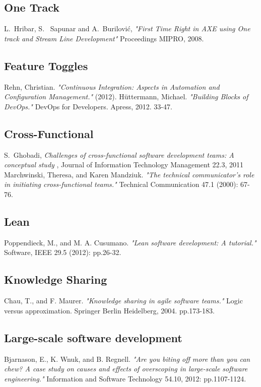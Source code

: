 \documentclass[ProjectPlan_innit.tex]{subfiles}
\begin{document}
\begin{thebibliography}{1}
\subsection{One Track}
\bibitem{} 
L.~Hribar, S. ~Sapunar and A.~Burilović, \emph{"First Time Right in AXE using One track and Stream Line Development"} Proceedings MIPRO, 2008.

\subsection{Feature Toggles}
\bibitem{} 
Rehn, Christian. \emph{"Continuous Integration: Aspects in Automation and Configuration Management."} (2012).
\bibitem{}
Hüttermann, Michael. \emph{"Building Blocks of DevOps."} DevOps for Developers. Apress, 2012. 33-47.


\subsection{Cross-Functional}
\bibitem{} 
S.~Ghobadi, \emph{Challenges of cross-functional software development teams: A conceptual study }, Journal of Information Technology Management 22.3, 2011
\bibitem{} 
Marchwinski, Theresa, and Karen Mandziuk. \emph{"The technical communicator’s role in initiating cross-functional teams."} Technical Communication 47.1 (2000): 67-76.

\subsection{Lean}
\bibitem{} 
Poppendieck, M., and M. A. Cusumano. \emph{"Lean software development: A tutorial."} Software, IEEE 29.5 (2012): pp.26-32.


\subsection{Knowledge Sharing}
\bibitem{} 
Chau, T., and F. Maurer. \emph{"Knowledge sharing in agile software teams."} Logic versus approximation. Springer Berlin Heidelberg, 2004. pp.173-183.

\subsection{Large-scale software development}
\bibitem{} 
Bjarnason, E., K. Wnuk, and B. Regnell. \emph{"Are you biting off more than you can chew? A case study on causes and effects of overscoping in large-scale software engineering."} Information and Software Technology 54.10, 2012: pp.1107-1124.



\end{thebibliography}
\end{document}
